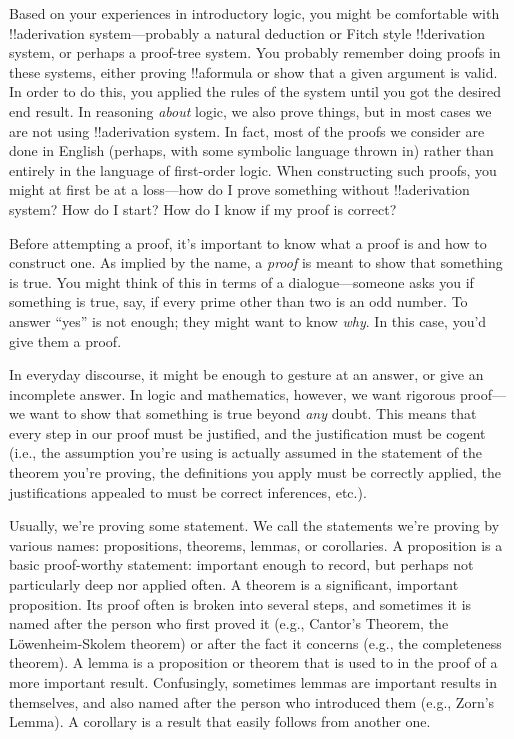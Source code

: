 \documentclass[../../../include/open-logic-section]{subfiles}
\begin{document}


Based on your experiences in introductory logic, you might be
comfortable with !!a{derivation} system---probably a natural deduction or
Fitch style !!{derivation} system, or perhaps a proof-tree system. You probably
remember doing proofs in these systems, either proving !!a{formula}
or show that a given argument is valid. In order to do this, you
applied the rules of the system until you got the desired end
result. In reasoning \emph{about} logic, we also prove things, but in
most cases we are not using !!a{derivation} system. In fact, most of the
proofs we consider are done in English (perhaps, with some symbolic
language thrown in) rather than entirely in the language of
first-order logic.  When constructing such proofs, you might at first
be at a loss---how do I prove something without !!a{derivation} system?  How
do I start? How do I know if my proof is correct?

Before attempting a proof, it's important to know what a proof is and
how to construct one.  As implied by the name, a \emph{proof} is meant
to show that something is true. You might think of this in terms of a
dialogue---someone asks you if something is true, say, if every prime
other than two is an odd number. To answer ``yes'' is not enough; they
might want to know \emph{why}. In this case, you'd give them a proof.

In everyday discourse, it might be enough to gesture at an answer, or
give an incomplete answer. In logic and mathematics, however, we want
rigorous proof---we want to show that something is true beyond \emph{any}
doubt. This means that every step in our proof must be justified, and
the justification must be cogent (i.e., the assumption you're using is
actually assumed in the statement of the theorem you're proving, the
definitions you apply must be correctly applied, the justifications
appealed to must be correct inferences, etc.).

Usually, we're proving some statement. We call the statements we're
proving by various names: propositions, theorems, lemmas, or
corollaries.  A proposition is a basic proof-worthy statement:
important enough to record, but perhaps not particularly deep nor
applied often. A theorem is a significant, important proposition. Its
proof often is broken into several steps, and sometimes it is named
after the person who first proved it (e.g., Cantor's Theorem, the
L\"owenheim-Skolem theorem) or after the fact it concerns (e.g., the
completeness theorem).  A lemma is a proposition or theorem that is
used to in the proof of a more important result. Confusingly,
sometimes lemmas are important results in themselves, and also named
after the person who introduced them (e.g., Zorn's Lemma). A corollary
is a result that easily follows from another one.
\end{document}
